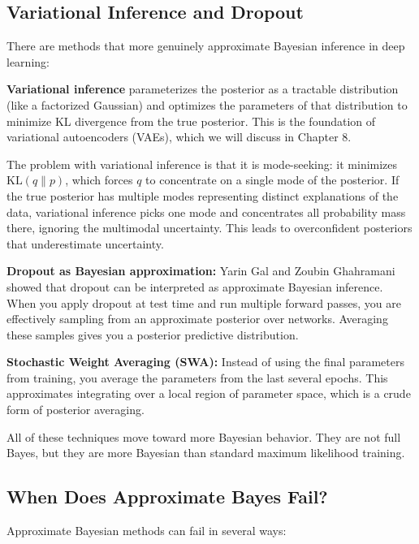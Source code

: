 \subsection{Variational Inference and Dropout}

There are methods that more genuinely approximate Bayesian inference in deep learning:

\textbf{Variational inference} parameterizes the posterior as a tractable distribution (like a factorized Gaussian) and optimizes the parameters of that distribution to minimize KL divergence from the true posterior. This is the foundation of variational autoencoders (VAEs), which we will discuss in Chapter 8.

The problem with variational inference is that it is mode-seeking: it minimizes $\text{KL}(q \| p)$, which forces $q$ to concentrate on a single mode of the posterior. If the true posterior has multiple modes representing distinct explanations of the data, variational inference picks one mode and concentrates all probability mass there, ignoring the multimodal uncertainty. This leads to overconfident posteriors that underestimate uncertainty.

\textbf{Dropout as Bayesian approximation:} Yarin Gal and Zoubin Ghahramani showed that dropout can be interpreted as approximate Bayesian inference. When you apply dropout at test time and run multiple forward passes, you are effectively sampling from an approximate posterior over networks. Averaging these samples gives you a posterior predictive distribution.

\textbf{Stochastic Weight Averaging (SWA):} Instead of using the final parameters from training, you average the parameters from the last several epochs. This approximates integrating over a local region of parameter space, which is a crude form of posterior averaging.

All of these techniques move toward more Bayesian behavior. They are not full Bayes, but they are more Bayesian than standard maximum likelihood training.

\subsection{When Does Approximate Bayes Fail?}

Approximate Bayesian methods can fail in several ways:

